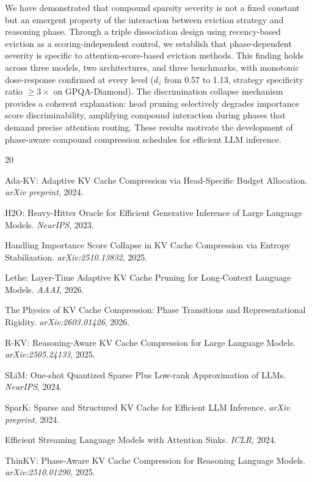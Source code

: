 \documentclass[11pt,a4paper]{article}
\begin{document}
We have demonstrated that compound sparsity severity is not a fixed constant but an emergent property of the interaction between eviction strategy and reasoning phase. Through a triple dissociation design using recency-based eviction as a scoring-independent control, we establish that phase-dependent severity is specific to attention-score-based eviction methods. This finding holds across three models, two architectures, and three benchmarks, with monotonic dose-response confirmed at every level ($d_z$ from 0.57 to 1.13, strategy specificity ratio $\geq 3\times$ on GPQA-Diamond). The discrimination collapse mechanism provides a coherent explanation: head pruning selectively degrades importance score discriminability, amplifying compound interaction during phases that demand precise attention routing. These results motivate the development of phase-aware compound compression schedules for efficient LLM inference.


\begin{thebibliography}{20}

Ada-KV: Adaptive KV Cache Compression via Head-Specific Budget Allocation.
\textit{arXiv preprint}, 2024.

H2O: Heavy-Hitter Oracle for Efficient Generative Inference of Large Language Models.
\textit{NeurIPS}, 2023.

Handling Importance Score Collapse in KV Cache Compression via Entropy Stabilization.
\textit{arXiv:2510.13832}, 2025.

Lethe: Layer-Time Adaptive KV Cache Pruning for Long-Context Language Models.
\textit{AAAI}, 2026.

The Physics of KV Cache Compression: Phase Transitions and Representational Rigidity.
\textit{arXiv:2603.01426}, 2026.

R-KV: Reasoning-Aware KV Cache Compression for Large Language Models.
\textit{arXiv:2505.24133}, 2025.

SLiM: One-shot Quantized Sparse Plus Low-rank Approximation of LLMs.
\textit{NeurIPS}, 2024.

SparK: Sparse and Structured KV Cache for Efficient LLM Inference.
\textit{arXiv preprint}, 2024.

Efficient Streaming Language Models with Attention Sinks.
\textit{ICLR}, 2024.

ThinKV: Phase-Aware KV Cache Compression for Reasoning Language Models.
\textit{arXiv:2510.01290}, 2025.

\end{thebibliography}
\end{document}
